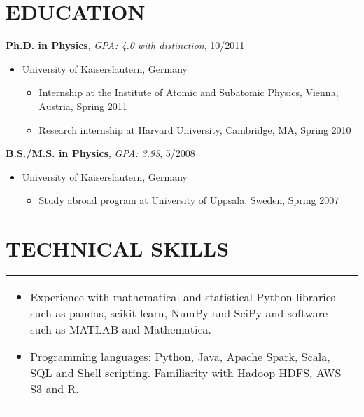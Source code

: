 \documentclass[10pt,centered]{./res} %
\begin{document}
\begin{resume}
\section{\color{ResumeBlue}EDUCATION}

{\bf Ph.D. in Physics}, {\it GPA: 4.0 with distinction}, 10/2011
\begin{itemize}
 \item[] University of Kaiserslautern, Germany
    \begin{itemize}
      \item Internship at the Institute of Atomic and Subatomic Physics, Vienna, Austria, Spring 2011
      \item Research internship at Harvard University, Cambridge, MA, Spring 2010
    \end{itemize}
\end{itemize}
\vspace*{-0.2cm}
{\bf B.S./M.S. in Physics}, {\it GPA: 3.93}, 5/2008
\begin{itemize}
 \item[] University of Kaiserslautern, Germany
     \begin{itemize}
      \item Study abroad program at University of Uppsala, Sweden, Spring 2007
    \end{itemize}
\end{itemize}

\section{\color{ResumeBlue}TECHNICAL SKILLS}

\vspace*{0.2cm}
\hspace*{-.9cm}
\begin{tabular}{p{5.85in}>{\raggedleft\arraybackslash}p{.1in}}
\begin{itemize}
  \item Experience with mathematical and statistical Python libraries such as pandas, scikit-learn, NumPy and SciPy and software such as MATLAB and {\sc Mathematica}.
  \item Programming languages: Python, Java, Apache Spark, Scala, SQL and Shell scripting. Familiarity with Hadoop HDFS, AWS S3 and R.
\end{itemize}
 & \\
\end{tabular}

\vspace*{-0.2cm}

\end{resume}
\end{document}
